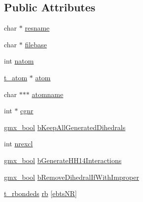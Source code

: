 \subsection*{\-Public \-Attributes}
\begin{DoxyCompactItemize}
\item 
char $\ast$ \hyperlink{structt__restp_a2c4efbe22be9f4c90587ce399eaf98bc}{resname}
\item 
char $\ast$ \hyperlink{structt__restp_af257d41f27e87dd4e66e8db01d16e3b4}{filebase}
\item 
int \hyperlink{structt__restp_a2bfb023ae6f44605304f224ec3a24ff9}{natom}
\item 
\hyperlink{structt__atom}{t\-\_\-atom} $\ast$ \hyperlink{structt__restp_aa548127a52983de353a90cb83b062100}{atom}
\item 
char $\ast$$\ast$$\ast$ \hyperlink{structt__restp_ad698358bcfcf7d0b82521b51f48ddfca}{atomname}
\item 
int $\ast$ \hyperlink{structt__restp_adb1b530fdf93bf5d9360080e17713b40}{cgnr}
\item 
\hyperlink{include_2types_2simple_8h_a8fddad319f226e856400d190198d5151}{gmx\-\_\-bool} \hyperlink{structt__restp_a5da161767e2c9189e9ac841df771e6eb}{b\-Keep\-All\-Generated\-Dihedrals}
\item 
int \hyperlink{structt__restp_a9b262c7dae8aee0bfedc688a87808cfe}{nrexcl}
\item 
\hyperlink{include_2types_2simple_8h_a8fddad319f226e856400d190198d5151}{gmx\-\_\-bool} \hyperlink{structt__restp_af03bfcf2df7b1520f7490c1ba017cffe}{b\-Generate\-H\-H14\-Interactions}
\item 
\hyperlink{include_2types_2simple_8h_a8fddad319f226e856400d190198d5151}{gmx\-\_\-bool} \hyperlink{structt__restp_ac89165b87423745899f7239357d05c03}{b\-Remove\-Dihedral\-If\-With\-Improper}
\item 
\hyperlink{structt__rbondeds}{t\-\_\-rbondeds} \hyperlink{structt__restp_acd184d45cd32f8d97dd4e66944bbb14a}{rb} \mbox{[}\hyperlink{share_2template_2gromacs_2hackblock_8h_a3153161a0d848ec64bf4895db3cf1be4a018bbf49e461419a9fce05a412e904ae}{ebts\-N\-R}\mbox{]}
\end{DoxyCompactItemize}


